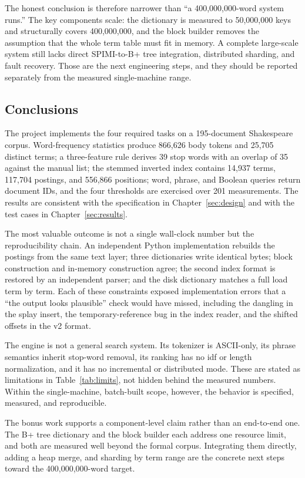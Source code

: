 The honest conclusion is therefore narrower than ``a 400,000,000-word system
runs.'' The key components scale: the dictionary is measured to 50,000,000
keys and structurally covers 400,000,000, and the block builder removes the
assumption that the whole term table must fit in memory. A complete large-scale
system still lacks direct SPIMI-to-B+ tree integration, distributed sharding,
and fault recovery. Those are the next engineering steps, and they should be
reported separately from the measured single-machine range.

\subsection{Conclusions}
\label{sec:conclusions}

The project implements the four required tasks on a 195-document Shakespeare
corpus. Word-frequency statistics produce 866,626 body tokens and 25,705
distinct terms; a three-feature rule derives 39 stop words with an overlap of
35 against the manual list; the stemmed inverted index contains 14,937 terms,
117,704 postings, and 556,866 positions; word, phrase, and Boolean queries
return document IDs, and the four thresholds are exercised over 201
measurements. The results are consistent with the specification in
Chapter~\ref{sec:design} and with the test cases in Chapter~\ref{sec:results}.

The most valuable outcome is not a single wall-clock number but the
reproducibility chain. An independent Python implementation rebuilds the
postings from the same text layer; three dictionaries write identical bytes;
block construction and in-memory construction agree; the second index format is
restored by an independent parser; and the disk dictionary matches a full load
term by term. Each of these constraints exposed implementation errors that a
``the output looks plausible'' check would have missed, including the dangling
 in the splay insert, the temporary-reference bug in the index
reader, and the shifted offsets in the v2 format.

The engine is not a general search system. Its tokenizer is ASCII-only, its
phrase semantics inherit stop-word removal, its ranking has no idf or length
normalization, and it has no incremental or distributed mode. These are stated
as limitations in Table~\ref{tab:limits}, not hidden behind the measured
numbers. Within the single-machine, batch-built scope, however, the behavior is
specified, measured, and reproducible.

The bonus work supports a component-level claim rather than an end-to-end one.
The B+ tree dictionary and the block builder each address one resource limit,
and both are measured well beyond the formal corpus. Integrating them directly,
adding a heap merge, and sharding by term range are the concrete next steps
toward the 400,000,000-word target.
